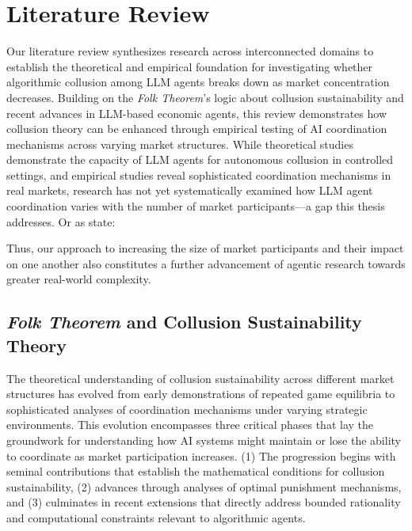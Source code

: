 \section{Literature Review}\label{sec:litrev}

Our literature review synthesizes research across interconnected domains to establish the theoretical and empirical foundation for investigating whether algorithmic collusion among LLM agents breaks down as market concentration decreases. Building on the \emph{Folk Theorem}'s logic about collusion sustainability and recent advances in LLM-based economic agents, this review demonstrates how collusion theory can be enhanced through empirical testing of AI coordination mechanisms across varying market structures. While theoretical studies demonstrate the capacity of LLM agents for autonomous collusion in controlled settings, and empirical studies reveal sophisticated coordination mechanisms in real markets, research has not yet systematically examined how LLM agent coordination varies with the number of market participants---a gap this thesis addresses. Or as \textcite[p.24]{fish_algorithmic_2025} state:
\begin{displayquote}
\end{displayquote}

Thus, our approach to increasing the size of market participants and their impact on one another also constitutes a further advancement of agentic research towards greater real-world complexity.

\subsection{\emph{Folk Theorem} and Collusion Sustainability Theory}

The theoretical understanding of collusion sustainability across different market structures has evolved from early demonstrations of repeated game equilibria to sophisticated analyses of coordination mechanisms under varying strategic environments. This evolution encompasses three critical phases that lay the groundwork for understanding how AI systems might maintain or lose the ability to coordinate as market participation increases. (1) The progression begins with seminal contributions that establish the mathematical conditions for collusion sustainability, (2) advances through analyses of optimal punishment mechanisms, and (3) culminates in recent extensions that directly address bounded rationality and computational constraints relevant to algorithmic agents.


